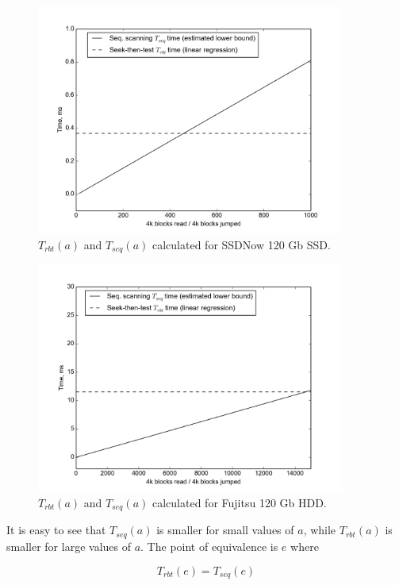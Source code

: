 \documentclass[final,5p,times,twocolumn,authoryear]{elsarticle}
\begin{document}
\begin{figure}
  \centerline{\includegraphics[width=0.9\textwidth]{figures/processing-time-ssd}}
  \caption{$T_{rbt}(a)$ and $T_{seq}(a)$ calculated for SSDNow 120 Gb SSD.}
  \label{fig:processing_time_ssd}
\end{figure}

\begin{figure}
  \centerline{\includegraphics[width=0.9\textwidth]{figures/processing-time-hdd}}
  \caption{$T_{rbt}(a)$ and $T_{seq}(a)$ calculated for Fujitsu 120 Gb HDD.}
  \label{fig:processing_time_hdd}
\end{figure}

It is easy to see that $T_{seq}(a)$ is smaller for small values of $a$, while $T_{rbt}(a)$ is smaller for large values of $a$. The point of equivalence is $e$ where

\begin{equation}
  T_{rbt}(e)=T_{seq}(e)
\end{equation}
\end{document}

